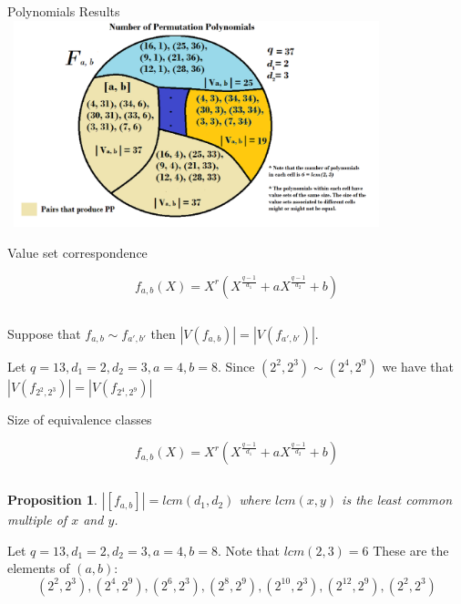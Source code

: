 \documentclass{beamer}
\newtheorem{proposition}{Proposition}
\begin{document}
\begin{frame}{Polynomials Results}
  \includegraphics[width=11cm, height=6cm]{clases}
\end{frame}

\begin{frame}{Value set correspondence}

  {\Large $$f_{a,b}(X) = X^r(X^{\frac{q-1}{d_1}} + aX^{\frac{q-1}{d_2}} +b)$$}

  $$$$

  \begin{theorem}

    Suppose that $f_{a, b} \sim f_{a',b'}$ then $|V(f_{a, b})| = |V(f_{a', b'})|$.

  \end{theorem}

  \begin{example}
    Let $q = 13, d_1 = 2, d_2 = 3, a = 4, b = 8$. Since $(2^2,2^3) \sim (2^4,2^9)$ we have that $|V(f_{2^2, 2^3})| = |V(f_{2^4, 2^9})|$
  \end{example}

\end{frame}

\begin{frame}{Size of equivalence classes}
  
  {\Large $$f_{a,b}(X) = X^r(X^{\frac{q-1}{d_1}} + aX^{\frac{q-1}{d_2}} +b)$$}

  $$$$

  \begin{proposition}
    $|[f_{a, b}]| = lcm(d_1,d_2)$ where $lcm(x,y)$ is the least common multiple of $x$ and $y$.
  \end{proposition}

  \begin{example}
    Let $q = 13, d_1 = 2, d_2 = 3, a = 4, b = 8$. Note that $lcm(2,3) = 6$ These are the elements of $(a,b)$:
    $$ (2^2, 2^3), (2^4, 2^9), (2^6, 2^3), (2^8, 2^9), (2^10, 2^3), (2^{12}, 2^9), (2^2, 2^3) $$
  \end{example}
\end{frame}
\end{document}
